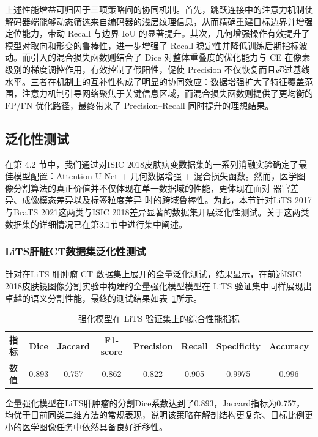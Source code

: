 上述性能增益可归因于三项策略间的协同机制。首先，跳跃连接中的注意力机制使解码器端能够动态筛选来自编码器的浅层纹理信息，从而精确重建目标边界并增强定位能力，带动 Recall 与边界 IoU 的显著提升。其次，几何增强操作有效提升了模型对取向和形变的鲁棒性，进一步增强了 Recall 稳定性并降低训练后期指标波动。而引入的混合损失函数则结合了 Dice 对整体重叠度的优化能力与 CE 在像素级别的梯度调控作用，有效控制了假阳性，促使 Precision 不仅恢复而且超过基线水平。三者在机制上的互补性构成了明显的协同效应：数据增强扩大了特征覆盖范围，注意力机制引导网络聚焦于关键信息区域，而混合损失函数则提供了更均衡的 FP/FN 优化路径，最终带来了 Precision–Recall 同时提升的理想结果。

\subsection{泛化性测试}

在第 4.2 节中，我们通过对ISIC 2018皮肤病变数据集的一系列消融实验确定了最佳模型配置：Attention U-Net + 几何数据增强 + 混合损失函数。然而，医学图像分割算法的真正价值并不仅体现在单一数据域的性能，更体现在面对 器官差异、成像模态差异以及标签粒度差异 时的跨域鲁棒性。为此，本节针对LiTS 2017与BraTS 2021这两类与ISIC 2018差异显著的数据集开展泛化性测试。关于这两类数据集的详细情况已在第3.1节中进行集中阐述。

\subsubsection{LiTS肝脏CT数据集泛化性测试}

针对在LiTS 肝肿瘤 CT 数据集上展开的全量泛化测试，结果显示，在前述ISIC 2018皮肤镜图像分割实验中构建的全量强化模型模型在 LiTS 验证集中同样展现出卓越的语义分割性能，最终的测试结果如表~\ref{tab:lits_final_metrics}所示。

\begin{table}[!htbp]
    \centering
    \caption{强化模型在 LiTS 验证集上的综合性能指标}
    \label{tab:lits_final_metrics}
    \begin{tabular}{lccccccc}
        \toprule
        指标 & Dice & Jaccard & F1-score & Precision & Recall & Specificity & Accuracy \\
        \midrule
        数值 & 0.893 & 0.757 & 0.862 & 0.822 & 0.905 & 0.9975 & 0.996\\
        \bottomrule
    \end{tabular}
\end{table}

全量强化模型在LiTS肝肿瘤的分割Dice系数达到了0.893，Jaccard指标为0.757，均优于目前同类二维方法的常规表现，说明该策略在解剖结构更复杂、目标比例更小的医学图像任务中依然具备良好迁移性。

